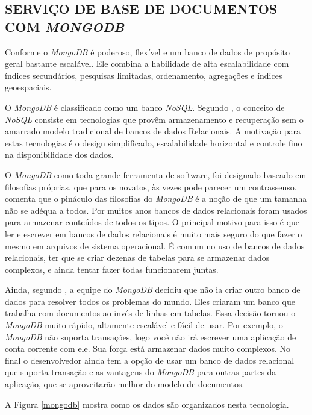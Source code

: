 \subsection{SERVIÇO DE BASE DE DOCUMENTOS COM \emph{MONGODB}}
\label{mongodb_sec}

Conforme  o \emph{MongoDB} é poderoso, flexível e um banco de dados de propósito geral bastante escalável. Ele combina a habilidade de alta escalabilidade com índices secundários, pesquisas limitadas, ordenamento, agregações e índices geoespaciais.

O \emph{MongoDB} é classificado como um banco \emph{NoSQL}. Segundo , o conceito de \emph{NoSQL} consiste em tecnologias que provêm armazenamento e recuperação sem o amarrado modelo tradicional de bancos de dados Relacionais. A motivação para estas tecnologias é o design simplificado, escalabilidade horizontal e controle fino na disponibilidade dos dados.

O \emph{MongoDB} como toda grande ferramenta de software, foi designado baseado em filosofias próprias, que para os novatos, às vezes pode parecer um contrassenso. 
 comenta que o pináculo das filosofias do \emph{MongoDB} é a noção de que um tamanha não se adéqua a todos. Por muitos anos bancos de dados relacionais foram usados para armazenar conteúdos de todos os tipos. O principal motivo para isso é que ler e escrever em bancos de dados relacionais é muito mais seguro do que fazer o mesmo em arquivos de sistema operacional.
É comum no uso de bancos de dados relacionais, ter que se criar dezenas de tabelas para se armazenar dados complexos, e ainda tentar fazer todas funcionarem juntas.

Ainda, segundo , a equipe do \emph{MongoDB} decidiu que não ia criar outro banco de dados para resolver todos os problemas do mundo. Eles criaram um banco que trabalha com documentos ao invés de linhas em tabelas. Essa decisão tornou o \emph{MongoDB} muito rápido, altamente escalável e fácil de usar. Por exemplo, o \emph{MongoDB} não suporta transações, logo você não irá escrever uma aplicação de conta corrente com ele. Sua força está armazenar dados muito complexos. No final o desenvolvedor ainda tem a opção de usar um banco de dados relacional que suporta transação e as vantagens do \emph{MongoDB} para outras partes da aplicação, que se aproveitarão melhor do modelo de documentos.


A Figura \ref{mongodb} mostra como os dados são organizados nesta tecnologia.

